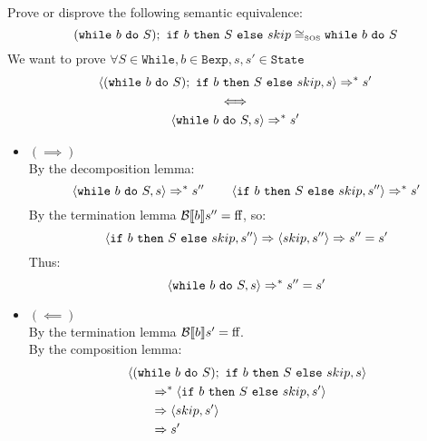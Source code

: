 \begin{exercise}{
    Prove or disprove the following semantic equivalence:
    \[ (\wwhile{b}{S});\ \texttt{if}\ b\ \texttt{then}\ S\ \texttt{else}\ skip \cong_{\text{\tiny SOS}} \wwhile{b}{S} \]\vspace*{-0.6cm}
}
    We want to prove $\forall S \in \texttt{While}, b \in \texttt{Bexp}, s, s' \in \texttt{State}$
    \begin{gather*}
        \instr{(\wwhile{b}{S});\ \texttt{if}\ b\ \texttt{then}\ S\ \texttt{else}\ skip}{s} \Rightarrow^* s' \\
        \iff \\
        \instr{\wwhile{b}{S}}{s} \Rightarrow^* s'
    \end{gather*}
    \begin{itemize}
        \item $(\implies)$ \vspace{0.2cm} \\
            By the decomposition lemma:\vspace*{-0.3cm}
            \[ \left<\texttt{while}\ b\ \texttt{do}\ S, s\right> \Rightarrow^* s'' \qquad \left<\texttt{if}\ b\ \texttt{then}\ S\ \texttt{else}\ skip, s''\right> \Rightarrow^* s' \]
            By the termination lemma $\mathcal{B} \llbracket b \rrbracket s'' = \text{ff}$, so:\vspace*{-0.3cm}
            \[ \instr{\texttt{if}\ b\ \texttt{then}\ S\ \texttt{else}\ skip}{s''} \Rightarrow \instr{skip}{s''} \Rightarrow s'' = s' \]
            Thus:
            \[ \left<\texttt{while}\ b\ \texttt{do}\ S, s\right> \Rightarrow^* s'' = s' \]
        \item $(\impliedby)$ \vspace{0.2cm} \\
            By the termination lemma $\mathcal{B} \llbracket b \rrbracket s' = \text{ff}$. \\
            By the composition lemma:\vspace*{-0.3cm}
            \begin{align*}
                &\instr{(\wwhile{b}{S});\ \texttt{if}\ b\ \texttt{then}\ S\ \texttt{else}\ skip}{s}
                \\&\qquad \Rightarrow^* \instr{\texttt{if}\ b\ \texttt{then}\ S\ \texttt{else}\ skip}{s'}
                \\&\qquad \Rightarrow \instr{skip}{s'}
                \\&\qquad \Rightarrow s'
            \end{align*}
    \end{itemize}
\end{exercise}
